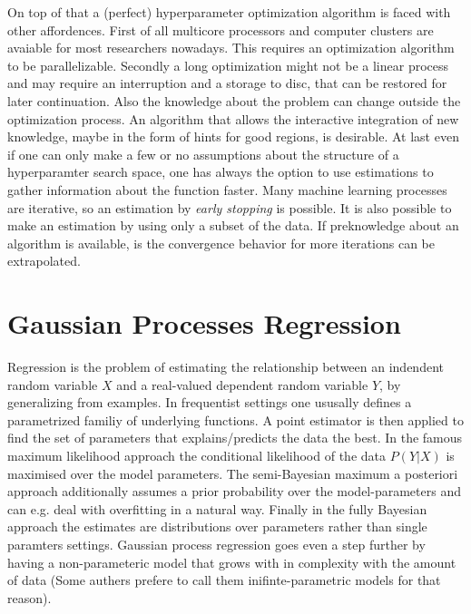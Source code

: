 \documentclass[english]{article}
\begin{document}
On top of that a (perfect) hyperparameter optimization algorithm is faced with other affordences. First of all multicore processors and computer clusters are avaiable for most researchers nowadays. This requires an optimization algorithm to be parallelizable. Secondly a long optimization might not be a linear process and may require an interruption and a storage to disc, that can be restored for later continuation. Also the knowledge about the problem can change outside the optimization process. An algorithm that allows the interactive integration of new knowledge, maybe in the form of hints for good regions, is desirable.
At last even if one can only make a few or no assumptions about the structure of a hyperparamter search space, one has always the option to use estimations to gather information about the function faster. Many machine learning processes are iterative, so an estimation by \textit{early stopping} is possible. It is also possible to make an estimation by using only a subset of the data. If preknowledge about an algorithm is available, is the convergence behavior for more iterations can be extrapolated.



\section{Gaussian Processes Regression}
\label{GPR}
Regression is the problem of estimating the relationship between an indendent random variable $X$ and a real-valued dependent random variable $Y$, by generalizing from examples. In frequentist settings one ususally defines a parametrized familiy of underlying functions. A point estimator is then applied to find the set of parameters that explains/predicts the data the best. In the famous maximum likelihood approach the conditional likelihood of the data $P(Y|X)$ is maximised over the model parameters. The semi-Bayesian maximum a posteriori approach additionally assumes a prior probability over the model-parameters and can e.g. deal with overfitting in a natural way. Finally in the fully Bayesian approach the estimates are distributions over parameters rather than single paramters settings. Gaussian process regression goes even a step further by having a non-parameteric model that grows with in complexity with the amount of data (Some authers prefere to call them inifinte-parametric models for that reason).
\end{document}
